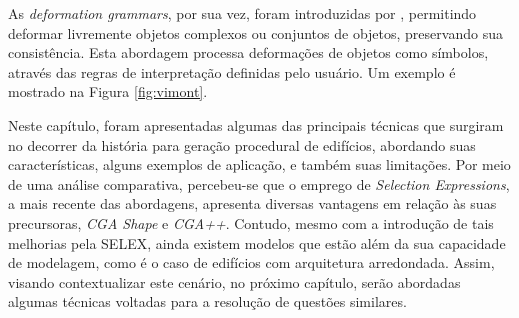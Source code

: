 \begin{figure}[h!]
	\centering
	\captionsetup{width=15cm}
	{}	
\end{figure}

As \textit{deformation grammars}, por sua vez, foram introduzidas por , permitindo deformar livremente objetos complexos ou conjuntos de objetos, preservando sua consistência. Esta abordagem processa deformações de objetos como símbolos, através das regras de interpretação definidas pelo usuário. Um exemplo é mostrado na Figura \ref{fig:vimont}.

\begin{figure}[h!]
	\centering
	\captionsetup{width=15cm}
	{}	
\end{figure}

\vspace{1cm}

Neste capítulo, foram apresentadas algumas das principais técnicas que surgiram no decorrer da história para geração procedural de edifícios, abordando suas características, alguns exemplos de aplicação, e também suas limitações. Por meio de uma análise comparativa, percebeu-se que o emprego de \textit{Selection Expressions}, a mais recente das abordagens, apresenta diversas vantagens em relação às suas precursoras, \textit{CGA Shape} e \textit{CGA++}. Contudo, mesmo com a introdução de tais melhorias pela \gls{SELEX}, ainda existem modelos que estão além da sua capacidade de modelagem, como é o caso de edifícios com arquitetura arredondada. Assim, visando contextualizar este cenário, no próximo capítulo, serão abordadas algumas técnicas voltadas para a resolução de questões similares.
